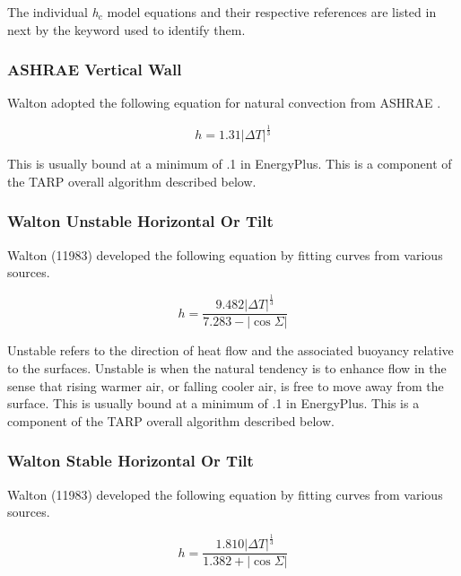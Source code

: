 The individual \emph{h\(_{c}\)} model equations and their respective references are listed in next by the keyword used to identify them.

\subsubsection{ASHRAE Vertical Wall}\label{ashrae-vertical-wall}

Walton adopted the following equation for natural convection from ASHRAE .

\begin{equation}
h = 1.31{\left| {\Delta T} \right|^{\frac{1}{3}}}
\end{equation}

This is usually bound at a minimum of .1 in EnergyPlus. This is a component of the TARP overall algorithm described below.

\subsubsection{Walton Unstable Horizontal Or Tilt}\label{walton-unstable-horizontal-or-tilt}

Walton (11983) developed the following equation by fitting curves from various sources.

\begin{equation}
h = \frac{{9.482{{\left| {\Delta T} \right|}^{\frac{1}{3}}}}}{{7.283 - \left| {\cos \Sigma } \right|}}
\end{equation}

Unstable refers to the direction of heat flow and the associated buoyancy relative to the surfaces. Unstable is when the natural tendency is to enhance flow in the sense that rising warmer air, or falling cooler air, is free to move away from the surface. This is usually bound at a minimum of .1 in EnergyPlus. This is a component of the TARP overall algorithm described below.

\subsubsection{Walton Stable Horizontal Or Tilt}\label{walton-stable-horizontal-or-tilt}

Walton (11983) developed the following equation by fitting curves from various sources.

\begin{equation}
h = \frac{{1.810{{\left| {\Delta T} \right|}^{\frac{1}{3}}}}}{{1.382 + \left| {\cos \Sigma } \right|}}
\end{equation}

